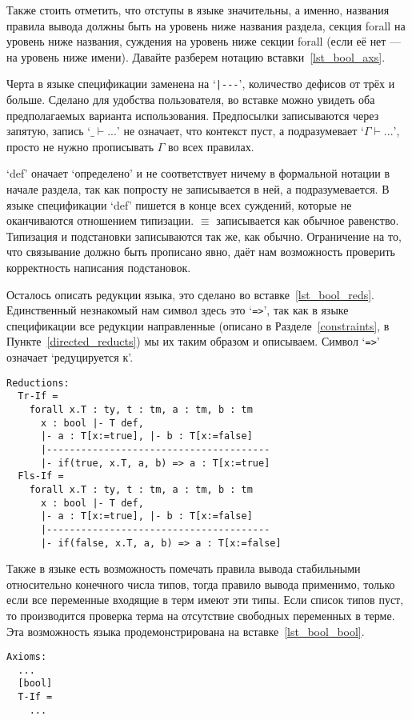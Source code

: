 Также стоить отметить, что отступы в языке значительны, а именно, названия правила вывода должны быть на уровень ниже названия раздела, секция forall на уровень ниже названия, суждения на уровень ниже секции forall (если её нет --- на уровень ниже имени). Давайте разберем нотацию вставки~\ref{lst_bool_axs}.

Черта в языке спецификации заменена на `\lstinline{|---}', количество дефисов от трёх и больше. Сделано для удобства пользователя, во вставке можно увидеть оба предполагаемых варианта использования. Предпосылки записываются через запятую, запись `$\_ \vdash ... $' не означает, что контекст пуст, а подразумевает `$\Gamma \vdash ... $', просто не нужно прописывать $\Gamma$ во всех правилах.

`def' оначает `определено' и не соответствует ничему в формальной нотации в начале раздела, так как попросту не записывается в ней, а подразумевается. В языке спецификации `def' пишется в конце всех суждений, которые не оканчиваются отношением типизации. $\equiv$ записывается как обычное равенство. Типизация и подстановки записываются так же, как обычно. Ограничение на то, что связывание должно быть прописано явно, даёт нам возможность проверить корректность написания подстановок.

Осталось описать редукции языка, это сделано во вставке~\ref{lst_bool_reds}. Единственный незнакомый нам символ здесь это `\lstinline{=>}', так как в языке спецификации все редукции направленные (описано в Разделе~\ref{constraints}, в Пункте~\ref{directed_reducts}) мы их таким образом и описываем. Символ `\lstinline{=>}' означает `редуцируется к'.

\begin{lstlisting}[label={lst_bool_reds}, caption={Редукции языка Bool, описанные в языке спецификации},captionpos=b, frame=single, float]
Reductions:
  Tr-If =
    forall x.T : ty, t : tm, a : tm, b : tm
      x : bool |- T def,
      |- a : T[x:=true], |- b : T[x:=false]
      |---------------------------------------
      |- if(true, x.T, a, b) => a : T[x:=true]
  Fls-If =
    forall x.T : ty, t : tm, a : tm, b : tm
      x : bool |- T def,
      |- a : T[x:=true], |- b : T[x:=false]
      |---------------------------------------
      |- if(false, x.T, a, b) => a : T[x:=false]
\end{lstlisting}

Также в языке есть возможность помечать правила вывода стабильными относительно конечного числа типов, тогда правило вывода применимо, только если все переменные входящие в терм имеют эти типы. Если список типов пуст, то производится проверка терма на отсутствие свободных переменных в терме. Эта возможность языка продемонстрирована на вставке~\ref{lst_bool_bool}.

\begin{lstlisting}[label={lst_bool_bool}, caption={Bool-стабильность правила вывода If, описанная в языке спецификации},captionpos=b, frame=single, float]
Axioms:
  ...
  [bool]
  T-If =
    ...
\end{lstlisting}
